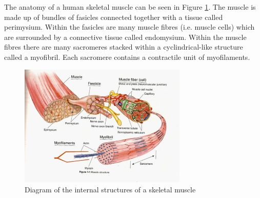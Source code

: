 The anatomy of a human skeletal muscle can be seen in Figure \ref{fig:muscle_parts}. The muscle is made up of bundles of fasicles connected together with a tissue called perimysium. Within the fasicles are many muscle fibres (i.e. muscle cells) which are surrounded by a connective tissue called endomysium. Within the muscle fibres there are many sacromeres stacked within a cyclindrical-like structure called a myofibril. Each sacromere contains a contractile unit of myofilaments. 
\begin{figure}[h!]
  \centering
  \includegraphics[width=8cm]{Figures/muscle structure.jpg}
  \caption{Diagram of the internal structures of a skeletal muscle\citep{Spina2014}}
  \label{fig:muscle_parts}
\end{figure}


